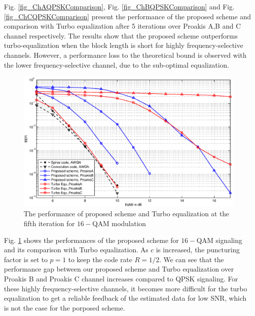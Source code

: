 \documentclass[conference]{IEEEtran}
\begin{document}
Fig. \ref{fig_ChAQPSKComparison}, Fig. \ref{fig_ChBQPSKComparison} and Fig. \ref{fig_ChCQPSKComparison}  present the performance of the proposed scheme and comparison with Turbo equalization after 5 iterations over Proakis A,B and C channel respectively. The results show that the proposed scheme outperforms turbo-equalization when the block length is short for highly frequency-selective channels.
However, a performance loss to the theoretical bound is observed with the lower frequency-selective channel, due to the sub-optimal equalization.
\begin{figure}[!t]
\centering
\includegraphics[width=\columnwidth]{16QAMComparison.eps}
\caption{The performance of proposed scheme and Turbo equalization at the fifth iteration for $16-$QAM modulation}
\label{fig_16QAMComparison}
\end{figure}

Fig. \ref{fig_16QAMComparison} shows the performances of the proposed scheme for $16-$QAM signaling and its comparison with Turbo equalization.
As $c$ is increased, the puncturing factor is set to $p=1$ to keep the code rate $R=1/2$. We can see that the performance gap between our proposed scheme and Turbo equalization over Proakis B and Proakis C channel increases compared to QPSK signaling. For these highly frequency-selective channels, it becomes more difficult for the turbo equalization to get a reliable feedback of the estimated data for low SNR, which is not the case for the porposed scheme.

\end{document}
